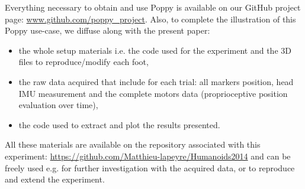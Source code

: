 Everything necessary to obtain and use Poppy is available on our GitHub project page: \url{www.github.com/poppy_project}. Also, to complete the illustration of this Poppy use-case, we diffuse along with the present paper:
\begin{itemize}
     \item the whole setup materials i.e. the code used for the experiment and the 3D files to reproduce/modify each foot,
     \item the raw data acquired that include for each trial: all markers position, head IMU measurement and the complete motors data (proprioceptive position evaluation over time),
     \item the code used to extract and plot the results presented.
\end{itemize}

All these materials are available on the repository associated with this experiment: \url{https://github.com/Matthieu-lapeyre/Humanoids2014} and can be freely used e.g. for further investigation with the acquired data, or to reproduce and extend the experiment.


